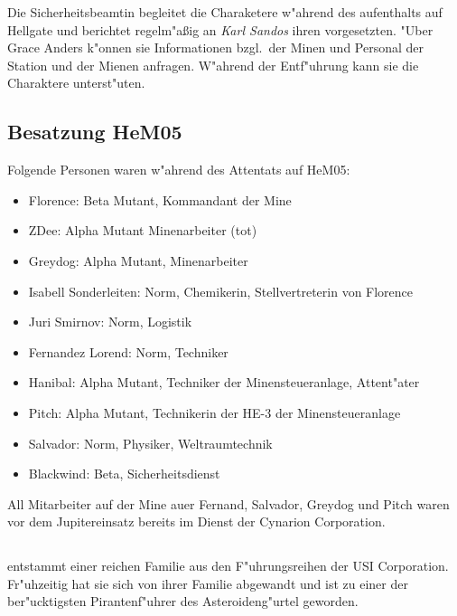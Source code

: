 Die Sicherheitsbeamtin begleitet die Charaketere w"ahrend des aufenthalts auf Hellgate und berichtet regelm"aßig an \emph{Karl Sandos} ihren vorgesetzten. "Uber Grace Anders k"onnen sie Informationen bzgl.~der Minen und Personal der Station und der Mienen anfragen. W"ahrend der Entf"uhrung kann sie die Charaktere unterst"uten.

\subsection{Besatzung HeM05}

Folgende Personen waren w"ahrend des Attentats auf HeM05:

\begin{itemize}
    \item Florence: Beta Mutant, Kommandant der Mine    
    \item ZDee: Alpha Mutant Minenarbeiter (tot)
    \item Greydog: Alpha Mutant, Minenarbeiter
    \item Isabell Sonderleiten: Norm, Chemikerin, Stellvertreterin von Florence
    \item Juri Smirnov: Norm, Logistik
    \item Fernandez Lorend: Norm, Techniker
    \item Hanibal: Alpha Mutant, Techniker der Minensteueranlage, Attent"ater
    \item Pitch: Alpha Mutant, Technikerin der HE-3 der Minensteueranlage
    \item Salvador: Norm, Physiker, Weltraumtechnik
    \item Blackwind: Beta, Sicherheitsdienst
\end{itemize}

All Mitarbeiter auf der Mine au\3er Fernand, Salvador, Greydog und Pitch waren vor dem Jupitereinsatz bereits im Dienst der Cynarion Corporation.

\newpage
\subsection[\pinyin{Wang Xiao Long}]{  }

   entstammt einer reichen Familie aus den F"uhrungsreihen der USI Corporation. Fr"uhzeitig hat sie sich von ihrer Familie abgewandt und ist zu einer der ber"ucktigsten Pirantenf"uhrer des Asteroideng"urtel geworden. 


